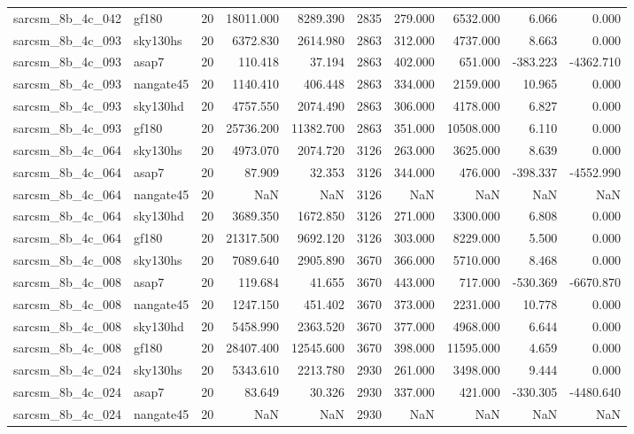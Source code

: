 \begin{tabular}{llrrrrrrrr}
sarcsm\_8b\_4c\_042 & gf180 & 20 & 18011.000 & 8289.390 & 2835 & 279.000 & 6532.000 & 6.066 & 0.000 \\
sarcsm\_8b\_4c\_093 & sky130hs & 20 & 6372.830 & 2614.980 & 2863 & 312.000 & 4737.000 & 8.663 & 0.000 \\
sarcsm\_8b\_4c\_093 & asap7 & 20 & 110.418 & 37.194 & 2863 & 402.000 & 651.000 & -383.223 & -4362.710 \\
sarcsm\_8b\_4c\_093 & nangate45 & 20 & 1140.410 & 406.448 & 2863 & 334.000 & 2159.000 & 10.965 & 0.000 \\
sarcsm\_8b\_4c\_093 & sky130hd & 20 & 4757.550 & 2074.490 & 2863 & 306.000 & 4178.000 & 6.827 & 0.000 \\
sarcsm\_8b\_4c\_093 & gf180 & 20 & 25736.200 & 11382.700 & 2863 & 351.000 & 10508.000 & 6.110 & 0.000 \\
sarcsm\_8b\_4c\_064 & sky130hs & 20 & 4973.070 & 2074.720 & 3126 & 263.000 & 3625.000 & 8.639 & 0.000 \\
sarcsm\_8b\_4c\_064 & asap7 & 20 & 87.909 & 32.353 & 3126 & 344.000 & 476.000 & -398.337 & -4552.990 \\
sarcsm\_8b\_4c\_064 & nangate45 & 20 & NaN & NaN & 3126 & NaN & NaN & NaN & NaN \\
sarcsm\_8b\_4c\_064 & sky130hd & 20 & 3689.350 & 1672.850 & 3126 & 271.000 & 3300.000 & 6.808 & 0.000 \\
sarcsm\_8b\_4c\_064 & gf180 & 20 & 21317.500 & 9692.120 & 3126 & 303.000 & 8229.000 & 5.500 & 0.000 \\
sarcsm\_8b\_4c\_008 & sky130hs & 20 & 7089.640 & 2905.890 & 3670 & 366.000 & 5710.000 & 8.468 & 0.000 \\
sarcsm\_8b\_4c\_008 & asap7 & 20 & 119.684 & 41.655 & 3670 & 443.000 & 717.000 & -530.369 & -6670.870 \\
sarcsm\_8b\_4c\_008 & nangate45 & 20 & 1247.150 & 451.402 & 3670 & 373.000 & 2231.000 & 10.778 & 0.000 \\
sarcsm\_8b\_4c\_008 & sky130hd & 20 & 5458.990 & 2363.520 & 3670 & 377.000 & 4968.000 & 6.644 & 0.000 \\
sarcsm\_8b\_4c\_008 & gf180 & 20 & 28407.400 & 12545.600 & 3670 & 398.000 & 11595.000 & 4.659 & 0.000 \\
sarcsm\_8b\_4c\_024 & sky130hs & 20 & 5343.610 & 2213.780 & 2930 & 261.000 & 3498.000 & 9.444 & 0.000 \\
sarcsm\_8b\_4c\_024 & asap7 & 20 & 83.649 & 30.326 & 2930 & 337.000 & 421.000 & -330.305 & -4480.640 \\
sarcsm\_8b\_4c\_024 & nangate45 & 20 & NaN & NaN & 2930 & NaN & NaN & NaN & NaN \\

\end{tabular}

